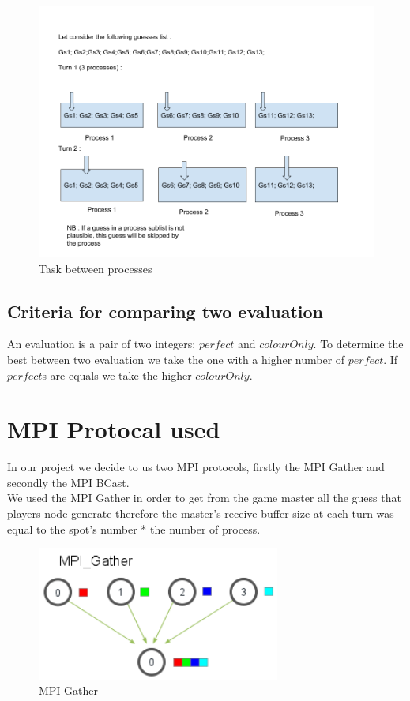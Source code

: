         \begin{figure}[H]
	    \centering
	    \includegraphics[width=15cm] {pTask.png}
	    \caption{Task between processes }
	    \label{plot12}
	\end{figure}
	
	
\subsection{Criteria for comparing two evaluation}
An evaluation is a pair of two integers: $perfect$ and $colourOnly$. To determine the best 
between two evaluation we take the one with a higher number of $perfect$. If $perfect$s are equals
we take the higher $colourOnly$.

\section{MPI Protocal used}
In our project we decide to us two MPI protocols, firstly the MPI Gather and secondly the MPI BCast. \\
We used the MPI Gather in order to get from the game master all the guess that players node generate therefore the master's receive buffer size at each turn  was equal to the spot's number * the number of process. 
        \begin{figure}[H]
	    \centering
	    \includegraphics[width=8cm] {gather.png}
	    \caption{MPI Gather }
	    \label{plot12}
	\end{figure}

